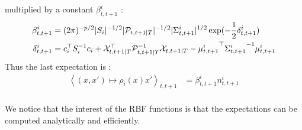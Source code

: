multiplied by a constant $\beta^{i}_{t,t+1}$ :
\begin{align*}
  \beta^i_{t,t+1} &= (2\pi)^{-p/2} |S_i|^{-1/2} |\mathcal{P}_{t,t+1 \mathbin{\vert} T}|^{-1/2} |\Sigma^i_{t,t+1}|^{1/2} \exp(-\frac{1}{2} \delta^i_{t,t+1})\\
  \delta^i_{t,t+1} &=
    c_i^{\top} S_i^{-1} c_i +
    \mathcal{X}_{t,t+1 \mathbin{\vert} T}^{\top} \mathcal{P}_{t,t+1 \mathbin{\vert} T}^{-1} \mathcal{X}_{t,t+1 \mathbin{\vert} T} - {\mu^i_{t,t+1}}^{\top} {\Sigma^i_{t,t+1}}^{-1} \mu^i_{t,t+1}\\
\end{align*}
Thus the last expectation is :
\begin{align*}
  \left< (x,x') \mapsto \rho_i(x) x' \right>_{t,t+1} &= \beta^i_{t,t+1}n^i_{t,t+1}\\
\end{align*}

We notice that the interest of the RBF functions is that the expectations can be computed analytically and efficiently.\\

